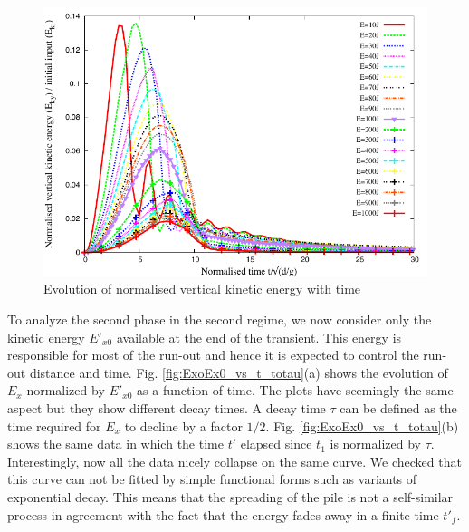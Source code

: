 \begin{figure}[tbhp]
\centering
\includegraphics[width=\textwidth]{Normalised_KEy_Slope}
\caption{Evolution of normalised vertical kinetic energy with time}
\label{fig:Normalised_KEy_Slope}
\end{figure}

To analyze the second phase in the second regime, we now consider only the 
kinetic energy $E'_{x0}$ available at the end of the transient. This energy 
is responsible for most of the run-out and hence it is expected to control the 
run-out distance and time. Fig. \ref{fig:ExoEx0_vs_t_totau}(a) shows the 
evolution of $E_x$ normalized by $E'_{x0}$ as a function of time. The plots 
have seemingly the same aspect but they show different decay times. A decay 
time $\tau$ can be defined as the time required for $E_x$ to decline by a 
factor $1/2$. Fig. \ref{fig:ExoEx0_vs_t_totau}(b) shows the same data in which 
the time $t'$ elapsed since $t_1$ is normalized by $\tau$. Interestingly, now 
all the data nicely collapse on the same curve. We checked that this curve can 
not be fitted by simple functional forms such as variants of exponential decay. 
This means that the spreading of the pile is not a self-similar process in 
agreement with the fact that the energy fades away in a finite time $t'_f$. 


